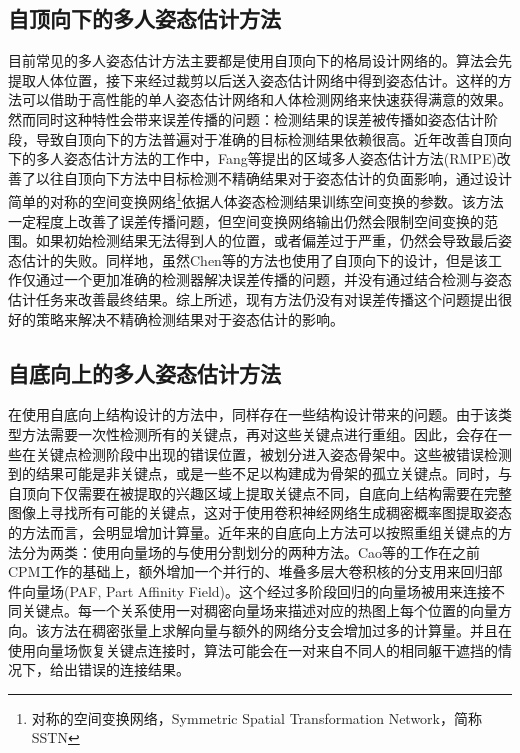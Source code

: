 \subsection{自顶向下的多人姿态估计方法}
\label{subsec:topdown}
目前常见的多人姿态估计方法主要都是使用自顶向下的格局设计网络的。算法会先提取人体位置，接下来经过裁剪以后送入姿态估计网络中得到姿态估计。这样的方法可以借助于高性能的单人姿态估计网络和人体检测网络来快速获得满意的效果。然而同时这种特性会带来误差传播的问题：检测结果的误差被传播如姿态估计阶段，导致自顶向下的方法普遍对于准确的目标检测结果依赖很高。近年改善自顶向下的多人姿态估计方法的工作中，Fang等提出的区域多人姿态估计方法\cite{fang2017rmpe}(RMPE)改善了以往自顶向下方法中目标检测不精确结果对于姿态估计的负面影响，通过设计简单的对称的空间变换网络\footnote{对称的空间变换网络，Symmetric Spatial Transformation Network，简称SSTN}依据人体姿态检测结果训练空间变换的参数。该方法一定程度上改善了误差传播问题，但空间变换网络输出仍然会限制空间变换的范围。如果初始检测结果无法得到人的位置，或者偏差过于严重，仍然会导致最后姿态估计的失败。同样地，虽然Chen等的方法\cite{Chen2018Cascaded}也使用了自顶向下的设计，但是该工作仅通过一个更加准确的检测器解决误差传播的问题，并没有通过结合检测与姿态估计任务来改善最终结果。综上所述，现有方法仍没有对误差传播这个问题提出很好的策略来解决不精确检测结果对于姿态估计的影响。

\subsection{自底向上的多人姿态估计方法}
\label{subsec:bottomup}
在使用自底向上结构设计的方法中，同样存在一些结构设计带来的问题。由于该类型方法需要一次性检测所有的关键点，再对这些关键点进行重组。因此，会存在一些在关键点检测阶段中出现的错误位置，被划分进入姿态骨架中。这些被错误检测到的结果可能是非关键点，或是一些不足以构建成为骨架的孤立关键点。同时，与自顶向下仅需要在被提取的兴趣区域上提取关键点不同，自底向上结构需要在完整图像上寻找所有可能的关键点，这对于使用卷积神经网络生成稠密概率图提取姿态的方法而言，会明显增加计算量。近年来的自底向上方法可以按照重组关键点的方法分为两类：使用向量场的与使用分割划分的两种方法。Cao等的工作\cite{Cao2016Realtime}在之前CPM工作的基础上，额外增加一个并行的、堆叠多层大卷积核的分支用来回归部件向量场(PAF, Part Affinity Field)。这个经过多阶段回归的向量场被用来连接不同关键点。每一个关系使用一对稠密向量场来描述对应的热图上每个位置的向量方向。该方法在稠密张量上求解向量与额外的网络分支会增加过多的计算量。并且在使用向量场恢复关键点连接时，算法可能会在一对来自不同人的相同躯干遮挡的情况下，给出错误的连接结果。


